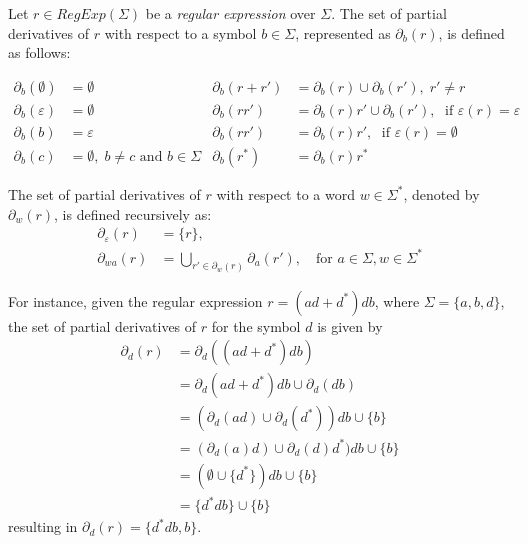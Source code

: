 Let $r \in RegExp(\Sigma)$ be a \textit{regular expression} over $\Sigma$. The set of partial derivatives of $r$ with respect to a symbol $b \in \Sigma$, represented as $\partial_b(r)$, is defined as follows:

\begin{align*}
	\partial_b(\emptyset) &= \emptyset		&	\partial_b(r + r') &= \partial_b(r) \cup \partial_b(r'), \; r' \neq r \\
	\partial_b(\varepsilon) &= \emptyset	&	\partial_b(r r') &= \partial_b(r)r' \cup \partial_b(r'), \; \text { if } \varepsilon(r) = \varepsilon \\
	\partial_b(b) &= \varepsilon & \partial_b(r r') &= \partial_b(r)r', \; \text { if } \varepsilon(r) = \emptyset \\
	\partial_b(c) &= \emptyset, \; b \neq c \text{ and } b \in \Sigma & \partial_b(r^*) &= \partial_b(r)r^*
\end{align*}

The set of partial derivatives of $r$ with respect to a word $w \in \Sigma^*$, denoted by $\partial_w(r)$, is defined recursively as:
\begin{align*}
	\partial_{\varepsilon}(r) &= \{r\}, \\
	\partial_{wa}(r) &= \bigcup_{r' \in \partial_w(r)} \partial_a(r'), \quad \text{for $a \in \Sigma, w \in \Sigma^*$}
\end{align*}

For instance, given the regular expression $r = (ad + d^*)db$, where $\Sigma = \{a,b,d\}$, the set of partial derivatives of $r$ for the symbol $d$ is given by
\begin{align*}
	\partial_d(r) &= \partial_d((ad + d^*)db) \\
	&= \partial_d(ad+d^*)db \cup \partial_d(db) \\
	&= (\partial_d(ad) \cup \partial_d(d^*))db \cup \{b\} \\
	&= (\partial_d(a)d) \cup \partial_d(d)d^*)db \cup \{b\} \\
	&= (\emptyset \cup \{d^*\})db \cup \{b\} \\
	&= \{d^*db\} \cup \{b\}
\end{align*}
resulting in $\partial_d(r) = \{d^*db, b\}$.

